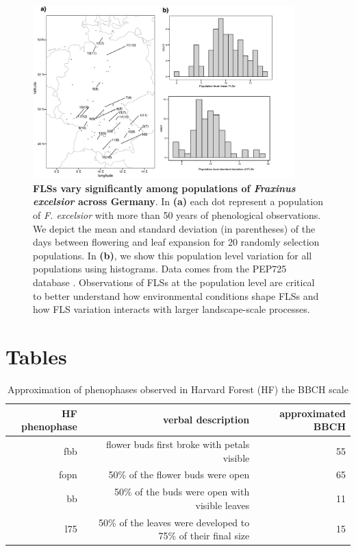 \documentclass[11pt]{article}
\begin{document}
  \begin{figure}[H]
  \centering
  \includegraphics[width=0.9\textwidth]{..//..//popmap.png} 
  \caption{\textbf{FLSs vary significantly among populations of \emph{Fraxinus excelsior} across Germany}. In \textbf{(a)} each dot represent a population of \emph{F. excelsior} with more than 50 years of phenological observations. We depict the mean and standard deviation (in parentheses) of the days between flowering and leaf expansion for 20 randomly selection populations. In \textbf{(b)}, we show this population level variation for all populations using histograms. Data comes from the PEP725 database \citep{PEP725}. Observations of FLSs at the population level are critical to better understand how environmental conditions shape FLSs and how FLS variation interacts with larger landscape-scale processes.}
  \label{fig:popmap}
  \end{figure}
  
  \pagebreak[4]
  
  \section*{Tables}
  
  \begin{table}[H]
  \centering
  \begin{tabular}{rrr}
  \hline
  HF phenophase & verbal description & approximated BBCH  \\ 
  \hline
  fbb & flower buds first broke with petals visible & 55 \\
  fopn &  50\% of the flower buds were open & 65 \\
  bb &  50\% of the buds were open with visible leaves & 11 \\
  l75 & 50\% of the leaves were developed to 75\% of their final size &  15 \\
  \hline
  \end{tabular}
  \caption{Approximation of phenophases observed in Harvard Forest (HF) \citep{OKeefe2015} the BBCH scale \citep{Finn2007}} 
  \label{tab:BBCH2HF}
  \end{table}
  
\end{document}

